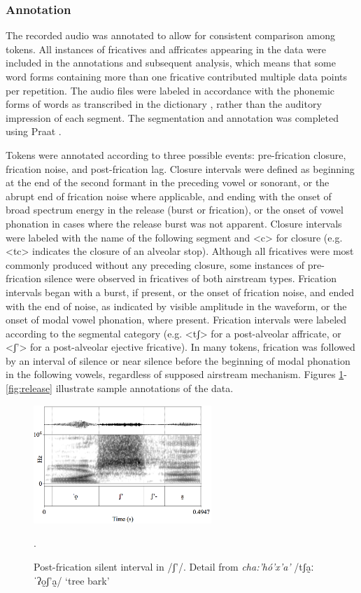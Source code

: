 \documentclass[output=paper,colorlinks,citecolor=brown]{langscibook}
\begin{document}
\subsubsection{Annotation}
The recorded audio was annotated to allow for consistent comparison among tokens. All instances of fricatives and affricates appearing in the data were included in the annotations and subsequent analysis, which means that some word forms containing more than one fricative contributed multiple data points per repetition. The audio files were labeled in accordance with the phonemic forms of words as transcribed in the dictionary \citep{Beck2011}, rather than the auditory impression of each segment. The segmentation and annotation was completed using Praat \citep{Boersma2018}.


 
Tokens were annotated according to three possible events: pre-frication closure, frication noise, and post-frication lag. Closure intervals were defined as beginning at the end of the second formant in the preceding vowel or sonorant, or the abrupt end of frication noise where applicable, and ending with the onset of broad spectrum energy in the release (burst or frication), or the onset of vowel phonation in cases where the release burst was not apparent. Closure intervals were labeled with the name of the following segment and <c> for closure (e.g. <tc> indicates the closure of an alveolar stop). Although all fricatives were most commonly produced without any preceding closure, some instances of pre-frication silence were observed in fricatives of both airstream types. Frication intervals began with a burst, if present, or the onset of frication noise, and ended with the end of noise, as indicated by visible amplitude in the waveform, or the onset of modal vowel phonation, where present. Frication intervals were labeled according to the segmental category (e.g. <{tʃ}> for a post-alveolar affricate, or <{ʃ'}> for a post-alveolar ejective fricative). In many tokens, frication was followed by an interval of silence or near silence before the beginning of modal phonation in the following vowels, regardless of supposed airstream mechanism. Figures \ref{fig:palvej}-\ref{fig:release} illustrate sample annotations of the data.
	

\begin{figure}[h]
    \includegraphics[width=0.6\textwidth]{figures/chaa1hO1x1a1.png}
    \caption{Post-frication silent interval in {/ʃ'/}. Detail from \textit{cha:'hó'x{'}a'} \mbox{/tʃa̰ːˈʔo̰ʃ'a̰/} `tree bark'}.
    \label{fig:palvej}
\end{figure}
\end{document}
